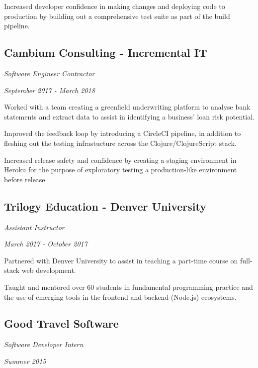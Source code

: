 Increased developer confidence in making changes and deploying code to
production by building out a comprehensive test suite as part of the build
pipeline.

\subsection*{Cambium Consulting - Incremental IT}
\noindent\begin{minipage}[b]{0.5\textwidth}
  \flushleft
  \emph{Software Engineer Contractor}
\end{minipage}
\noindent\begin{minipage}[b]{0.5\textwidth}
  \flushright
  \emph{September 2017 - March 2018}
\end{minipage}

Worked with a team creating a greenfield underwriting platform to analyse bank
statements and extract data to assist in identifying a business' loan risk
potential.

Improved the feedback loop by introducing a CircleCI pipeline, in addition
to fleshing out the testing infrastucture across the Clojure/ClojureScript
stack.

Increased release safety and confidence by creating a staging environment in
Heroku for the purpose of exploratory testing a production-like environment
before release.

\subsection*{Trilogy Education - Denver University}
\noindent\begin{minipage}[b]{0.5\textwidth}
  \flushleft
  \emph{Assistant Instructor}
\end{minipage}
\noindent\begin{minipage}[b]{0.5\textwidth}
  \flushright
  \emph{March 2017 - October 2017}
\end{minipage}

Partnered with Denver University to assist in teaching a part-time course on
full-stack web development.

Taught and mentored over 60 students in fundamental programming practice and the
use of emerging tools in the frontend and backend (Node.js) ecosystems.

\subsection*{Good Travel Software}
\noindent\begin{minipage}[b]{0.5\textwidth}
  \flushleft
  \emph{Software Developer Intern}
\end{minipage}
\noindent\begin{minipage}[b]{0.5\textwidth}
  \flushright
  \emph{Summer 2015}
\end{minipage}

